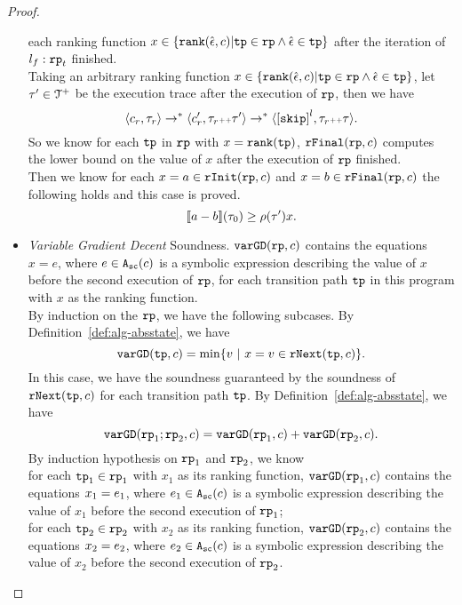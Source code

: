 \begin{proof}
\begin{itemize}
 each ranking function 
 $x \in \left\{ \locbound(\absevent, c) | \tpath \in \rprog \land \absevent \in \tpath \right\}$ after the iteration of $l_f:\mathtt{rp}_t$ finished.
 \\
 Taking an arbitrary ranking function $x \in \left\{ \locbound(\absevent, c) | \tpath \in \rprog \land \absevent \in \tpath \right\}$,
 let $\mathtt{\tau}' \in \mathcal{T}^{+}$ be the execution trace after the execution of $\mathtt{rp}$,  then we have
 \[
   \config{c_r, \trace_r} \to^* \config{c_r', \trace_r \tracecat \trace'} \to^* \config{\clabel{\eskip}^{l}, \trace_r \tracecat \trace}.
 \]
So we know for each $\mathtt{tp}$ in $\mathtt{rp}$ with $x = \mathtt{rank}(\mathtt{tp})$,
$\mathtt{rFinal}(\mathtt{rp}, c)$ computes the lower bound on the value of $x$ after the execution of $\mathtt{rp}$ finished.
\\
Then we know for each $ x = a \in \mathtt{rInit}(\mathtt{rp}, c) $ and $ x = b \in \mathtt{rFinal}(\mathtt{rp}, c) $
the following holds and this case is proved.
\[
  \llbracket a - b \rrbracket(\mathtt{\tau}_0) \geq \rho(\mathtt{\tau}') x.
\]
\item   \emph{Variable Gradient Decent} Soundness.
$\mathtt{varGD}(\mathtt{rp}, c)$ contains the equations $x = e$, where $e \in {\ensuremath{\mathtt{A_{sc}}}}(c)$ is a
  symbolic expression describing the value of $x$ before the second execution of $\mathtt{rp}$,
  for each transition path $\mathtt{tp}$ in this program with $x$ as the ranking function.
\\
 By induction on the $\mathtt{rp}$, we have the following subcases.
 By Definition~\ref{def:alg-absstate}, we have
\[
   \varGD(\tpath, c) =  \min\left\{v  ~|~ x = v \in \rfnext(\tpath, c) \right\}.
\]
In this case, we have the soundness guaranteed by the soundness of $\mathtt{rNext}(\mathtt{tp}, c)$ for each transition path $\mathtt{tp}$.
 By Definition~\ref{def:alg-absstate}, we have
\[
\mathtt{varGD}(\mathtt{rp}_1;\mathtt{rp}_2, c) =  \mathtt{varGD}(\mathtt{rp}_1, c) + \mathtt{varGD}(\mathtt{rp}_2, c).
\]
By induction hypothesis on $\mathtt{rp}_1$ and $\mathtt{rp}_2$, we know
\\
for each $\mathtt{tp}_1 \in \mathtt{rp}_1$ with $x_1$ as its ranking function,
$\mathtt{varGD}(\mathtt{rp}_1, c)$ contains the equations $x_1 = e_1$, where $e_1 \in {\ensuremath{\mathtt{A_{sc}}}}(c)$ is a
symbolic expression describing the value of $x_1$ before the second execution of $\mathtt{rp}_1$;
\\
for each $\mathtt{tp}_2 \in \mathtt{rp}_2$ with $x_2$ as its ranking function,
$\mathtt{varGD}(\mathtt{rp}_2, c)$ contains the equations $x_2 = e_2$, where $e_2 \in {\ensuremath{\mathtt{A_{sc}}}}(c)$ is a
symbolic expression describing the value of $x_2$ before the second execution of $\mathtt{rp}_2$.
\\

\end{itemize}
\end{proof}
